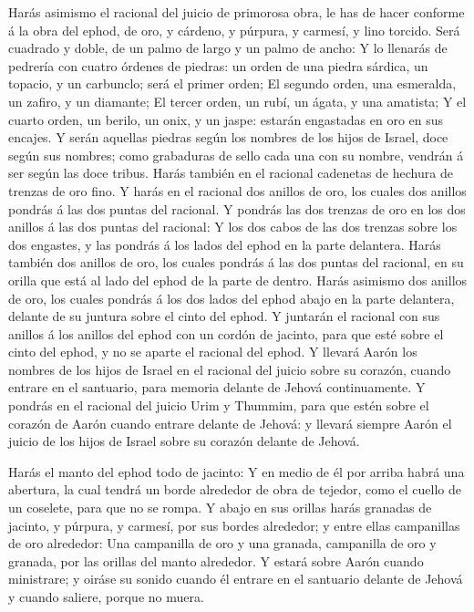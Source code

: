  Harás asimismo el racional del juicio de primorosa obra,
le has de hacer conforme á la obra del ephod, de oro, y cárdeno, y
púrpura, y carmesí, y lino torcido.  Será cuadrado y doble,
de un palmo de largo y un palmo de ancho:  Y lo llenarás de
pedrería con cuatro órdenes de piedras: un orden de una piedra sárdica,
un topacio, y un carbunclo; será el primer orden;  El
segundo orden, una esmeralda, un zafiro, y un diamante;  El
tercer orden, un rubí, un ágata, y una amatista;  Y el
cuarto orden, un berilo, un onix, y un jaspe: estarán engastadas en oro
en sus encajes.  Y serán aquellas piedras según los nombres
de los hijos de Israel, doce según sus nombres; como grabaduras de sello
cada una con su nombre, vendrán á ser según las doce tribus.
 Harás también en el racional cadenetas de hechura de
trenzas de oro fino.  Y harás en el racional dos anillos de
oro, los cuales dos anillos pondrás á las dos puntas del racional.
 Y pondrás las dos trenzas de oro en los dos anillos á las
dos puntas del racional:  Y los dos cabos de las dos
trenzas sobre los dos engastes, y las pondrás á los lados del ephod en
la parte delantera.  Harás también dos anillos de oro, los
cuales pondrás á las dos puntas del racional, en su orilla que está al
lado del ephod de la parte de dentro.  Harás asimismo dos
anillos de oro, los cuales pondrás á los dos lados del ephod abajo en la
parte delantera, delante de su juntura sobre el cinto del ephod.
 Y juntarán el racional con sus anillos á los anillos del
ephod con un cordón de jacinto, para que esté sobre el cinto del ephod,
y no se aparte el racional del ephod.  Y llevará Aarón los
nombres de los hijos de Israel en el racional del juicio sobre su
corazón, cuando entrare en el santuario, para memoria delante de Jehová
continuamente.  Y pondrás en el racional del juicio Urim y
Thummim, para que estén sobre el corazón de Aarón cuando entrare delante
de Jehová: y llevará siempre Aarón el juicio de los hijos de Israel
sobre su corazón delante de Jehová.

 Harás el manto del ephod todo de jacinto:  Y
en medio de él por arriba habrá una abertura, la cual tendrá un borde
alrededor de obra de tejedor, como el cuello de un coselete, para que no
se rompa.  Y abajo en sus orillas harás granadas de
jacinto, y púrpura, y carmesí, por sus bordes alrededor; y entre ellas
campanillas de oro alrededor:  Una campanilla de oro y una
granada, campanilla de oro y granada, por las orillas del manto
alrededor.  Y estará sobre Aarón cuando ministrare; y
oiráse su sonido cuando él entrare en el santuario delante de Jehová y
cuando saliere, porque no muera.

